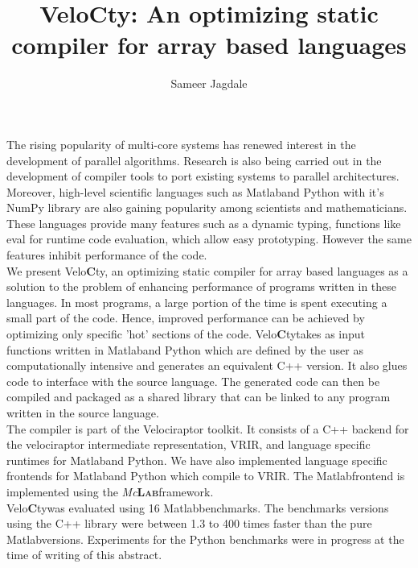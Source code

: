 \documentclass[a4paper, 12pt]{article}
\newcommand{\matlab}{{\textsc Matlab}\space}
\newcommand{\velocty}{{Velo\textbf{C}ty}\space}
\newcommand{\smclab}{\textrm{\textsl{Mc}\textbf{\textsc{Lab}}}}
\newcommand{\mclab}{\smclab\space}
\begin{document}
\title{\velocty : An optimizing static compiler for array based languages}
\author{Sameer Jagdale}
\maketitle
The rising popularity of multi-core systems has renewed interest in the development of parallel algorithms. Research is also being carried out in the development of compiler tools to port existing systems to parallel architectures. Moreover, high-level scientific languages such as \matlab and Python with it's NumPy library are also gaining popularity among scientists and mathematicians. These languages provide many features such as a dynamic typing, functions like eval for runtime code evaluation, which allow easy prototyping. However the same features inhibit performance of the code. \\
We present \velocty, an optimizing static compiler for array based languages as a solution to the problem of enhancing performance of programs written in these languages. In most programs, a large portion of the time is spent executing a small part of the code. Hence, improved performance can be achieved by optimizing only specific 'hot' sections of the code. \velocty takes as input functions written in \matlab and Python which are defined by the user as computationally intensive and generates an equivalent C++ version. It also glues code to interface with the source language. The generated code can then be compiled and packaged as a shared library that can be linked to any program written in the source language.\\
The compiler is part of the Velociraptor toolkit. It consists of a C++ backend for the velociraptor intermediate representation, VRIR, and language specific runtimes for \matlab and Python. We have also implemented language specific frontends for \matlab and Python which compile to VRIR. The \matlab frontend is implemented using the \mclab framework. \\
\velocty was evaluated using 16 \matlab benchmarks. The benchmarks versions using the C++ library were between 1.3 to 400 times faster than the pure \matlab versions. Experiments for the Python benchmarks were in progress at the time of writing of this abstract.  
\end{document}
